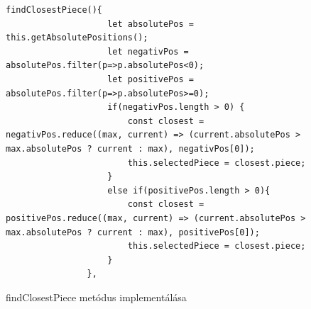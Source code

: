 \documentclass[a4paper,twoside]{article}
\begin{document}
\begin{itemize}
	\begin{figure}
		\caption{findClosestPiece metódus implementálása}
		\begin{minipage}{\textwidth}
			\begin{lstlisting}[style=javascriptStyle]
				findClosestPiece(){
					let absolutePos = this.getAbsolutePositions();
					let negativPos = absolutePos.filter(p=>p.absolutePos<0);
					let positivePos = absolutePos.filter(p=>p.absolutePos>=0);
					if(negativPos.length > 0) {
						const closest = negativPos.reduce((max, current) => (current.absolutePos > max.absolutePos ? current : max), negativPos[0]);
						this.selectedPiece = closest.piece;
					}
					else if(positivePos.length > 0){
						const closest = positivePos.reduce((max, current) => (current.absolutePos > max.absolutePos ? current : max), positivePos[0]);
						this.selectedPiece = closest.piece;
					}
				},
			\end{lstlisting}
		\end{minipage}
		

\end{figure}
\end{itemize}
\end{document}
